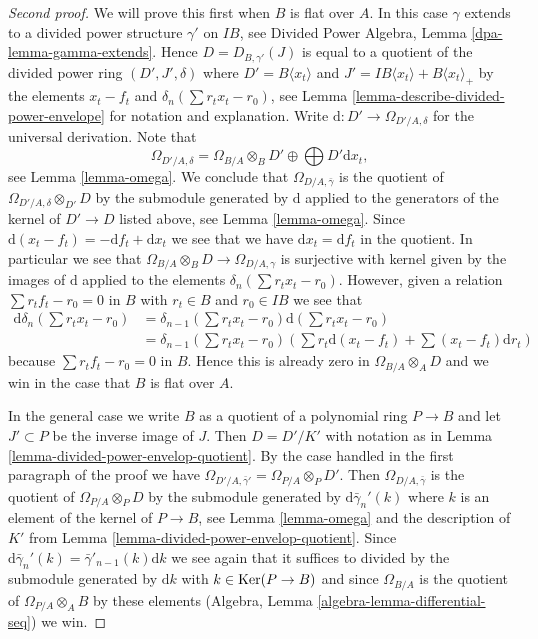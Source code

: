\begin{proof}[Second proof]
We will prove this first when $B$ is flat over $A$. In this case $\gamma$
extends to a divided power structure $\gamma'$ on $IB$, see
Divided Power Algebra, Lemma \ref{dpa-lemma-gamma-extends}.
Hence $D = D_{B, \gamma'}(J)$ is equal to a quotient of
the divided power ring $(D', J', \delta)$ where $D' =  B\langle x_t \rangle$
and $J' = IB\langle x_t \rangle + B\langle x_t \rangle_{+}$
by the elements $x_t - f_t$ and $\delta_n(\sum r_t x_t - r_0)$, see
Lemma \ref{lemma-describe-divided-power-envelope} for notation
and explanation. Write $\text{d} : D' \to \Omega_{D'/A, \delta}$
for the universal derivation. Note that
$$
\Omega_{D'/A, \delta} =
\Omega_{B/A} \otimes_B D' \oplus \bigoplus D' \text{d}x_t,
$$
see Lemma \ref{lemma-omega}. We conclude that $\Omega_{D/A, \bar\gamma}$
is the quotient of $\Omega_{D'/A, \delta} \otimes_{D'} D$ by the submodule
generated by $\text{d}$ applied to the generators of the
kernel of $D' \to D$ listed above, see Lemma \ref{lemma-omega}.
Since $\text{d}(x_t - f_t) = - \text{d}f_t + \text{d}x_t$
we see that we have $\text{d}x_t = \text{d}f_t$ in the quotient.
In particular we see that $\Omega_{B/A} \otimes_B D \to \Omega_{D/A, \gamma}$
is surjective with kernel given by the images of $\text{d}$
applied to the elements $\delta_n(\sum r_t x_t - r_0)$.
However, given a relation $\sum r_tf_t - r_0 = 0$ in $B$ with
$r_t \in B$ and $r_0 \in IB$ we see that
\begin{align*}
\text{d}\delta_n(\sum r_t x_t - r_0)
& =
\delta_{n - 1}(\sum r_t x_t - r_0)\text{d}(\sum r_t x_t - r_0)
\\
& =
\delta_{n - 1}(\sum r_t x_t - r_0)
\left(
\sum r_t\text{d}(x_t - f_t) + \sum (x_t - f_t)\text{d}r_t
\right)
\end{align*}
because $\sum r_tf_t - r_0 = 0$ in $B$. Hence this is already zero in
$\Omega_{B/A} \otimes_A D$ and we win in the case that $B$ is flat over $A$.

\medskip\noindent
In the general case we write $B$ as a quotient of a polynomial ring
$P \to B$ and let $J' \subset P$ be the inverse image of $J$. Then
$D = D'/K'$ with notation as in
Lemma \ref{lemma-divided-power-envelop-quotient}.
By the case handled in the first paragraph of the proof we have
$\Omega_{D'/A, \bar\gamma'} = \Omega_{P/A} \otimes_P D'$. Then
$\Omega_{D/A, \bar \gamma}$ is the quotient of $\Omega_{P/A} \otimes_P D$
by the submodule generated by $\text{d}\bar\gamma_n'(k)$ where $k$
is an element of the kernel of $P \to B$, see
Lemma \ref{lemma-omega} and the description of $K'$ from
Lemma \ref{lemma-divided-power-envelop-quotient}. Since
$\text{d}\bar\gamma_n'(k) = \bar\gamma'_{n - 1}(k)\text{d}k$ we see
again that it suffices to divided by the submodule generated by
$\text{d}k$ with $k \in \mathop{\mathrm{Ker}}(P \to B)$ and since $\Omega_{B/A}$
is the quotient of $\Omega_{P/A} \otimes_A B$ by these elements
(Algebra, Lemma \ref{algebra-lemma-differential-seq}) we win.
\end{proof}

